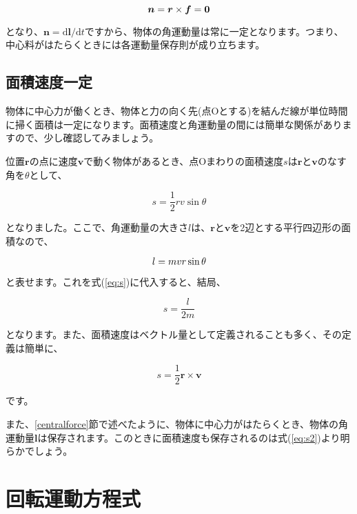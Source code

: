 \begin{equation}
    \bm{n}=\bm{r}\times\bm{f}=\bm{0} \notag
\end{equation}

となり、$\bm{n}=\mathrm{d}\bm{l}/\mathrm{d}t$ですから、物体の角運動量は常に一定となります。つまり、中心料がはたらくときには各運動量保存則が成り立ちます。



\subsection{面積速度一定}
\label{areavelocity}
物体に中心力が働くとき、物体と力の向く先(点Oとする)を結んだ線が単位時間に掃く面積は一定になります。面積速度と角運動量の間には簡単な関係がありますので、少し確認してみましょう。

位置$\bm{r}$の点に速度$\bm{v}$で動く物体があるとき、点Oまわりの面積速度$s$は$\bm{r}$と$\bm{v}$のなす角を$\theta$として、

\begin{equation}
\label{eq:s}
    s = \frac{1}{2}rv\sin\theta
\end{equation}

となりました。ここで、角運動量の大きさ$l$は、$\bm{r}$と$\bm{v}$を2辺とする平行四辺形の面積なので、

\begin{equation}
    l = mvr\sin\theta \notag
\end{equation}

と表せます。これを式(\ref{eq:s})に代入すると、結局、

\begin{equation}
\label{eq:s2}
    s = \frac{l}{2m}
\end{equation}

となります。また、面積速度はベクトル量として定義されることも多く、その定義は簡単に、

\begin{equation}
    s = \frac{1}{2}\bm{r}\times\bm{v}
\end{equation}

です。

また、\ref{centralforce}節で述べたように、物体に中心力がはたらくとき、物体の角運動量$\bm{l}$は保存されます。このときに面積速度も保存されるのは式(\ref{eq:s2})より明らかでしょう。




\section{回転運動方程式}
\label{rotationequation}
